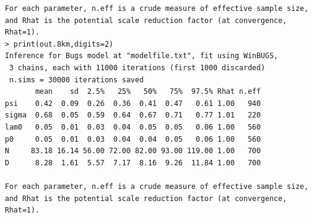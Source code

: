 {{\begin{verbatim}
For each parameter, n.eff is a crude measure of effective sample size,
and Rhat is the potential scale reduction factor (at convergence, Rhat=1).
> print(out.8km,digits=2)
Inference for Bugs model at "modelfile.txt", fit using WinBUGS,
 3 chains, each with 11000 iterations (first 1000 discarded)
 n.sims = 30000 iterations saved
       mean    sd  2.5%   25%   50%   75%  97.5% Rhat n.eff
psi    0.42  0.09  0.26  0.36  0.41  0.47   0.61 1.00   940
sigma  0.68  0.05  0.59  0.64  0.67  0.71   0.77 1.01   220
lam0   0.05  0.01  0.03  0.04  0.05  0.05   0.06 1.00   560
p0     0.05  0.01  0.03  0.04  0.04  0.05   0.06 1.00   560
N     83.18 16.14 56.00 72.00 82.00 93.00 119.00 1.00   700
D      8.28  1.61  5.57  7.17  8.16  9.26  11.84 1.00   700

For each parameter, n.eff is a crude measure of effective sample size,
and Rhat is the potential scale reduction factor (at convergence, Rhat=1).
\end{verbatim}
}

}

